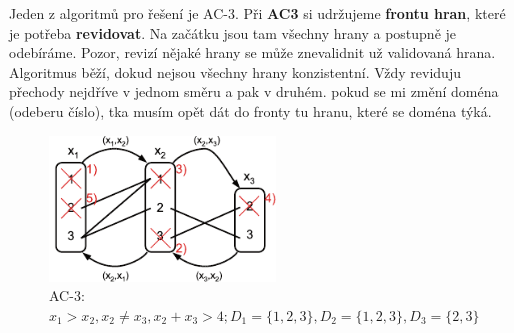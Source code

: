 Jeden z algoritmů pro řešení je AC-3. Při \textbf{AC3} si udržujeme \textbf{frontu hran}, které je potřeba \textbf{revidovat}. Na začátku jsou tam všechny hrany a postupně je odebíráme. Pozor, revizí nějaké hrany se může znevalidnit už validovaná hrana. Algoritmus běží, dokud nejsou všechny hrany konzistentní. Vždy reviduju přechody nejdříve v jednom směru a pak v druhém. pokud se mi změní doména (odeberu číslo), tka musím opět dát do fronty tu hranu, které se doména týká.

\begin{figure}[h]
    \begin{center}
        \includegraphics[width=60mm]{10/images/ac3}
    \end{center}
    \vspace{-10px}
    \caption{AC-3: $x_1 > x_2, x_2 \neq x_3, x_2+x_3 > 4; D_1 = \{1,2,3\}, D_2 = \{1,2,3\}, D_3 = \{2,3\}$}
\end{figure}
